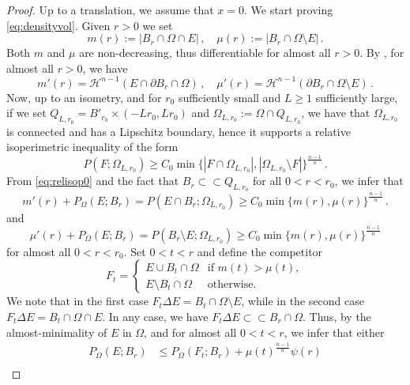 \documentclass[a4paper,reqno,11pt]{amsart}
\newcommand{\Hau}{{\mathcal H}} %
\newcommand{\de}{\partial}
\newcommand{\difsim}{\Delta}
\renewcommand{\Subset}{\subset\!\subset}
\newcommand{\pr}{P_{\Omega}}
\newcommand{\p}{P}
\begin{document}
\begin{proof}
		Up to a translation, we assume that $x=0$. We start proving \eqref{eq:densityvol}. Given $r>0$ we set
		\[
		m(r) := |B_{r} \cap \Omega\cap E| \, , \quad \mu(r) := |B_{r} \cap \Omega \setminus E| \,.
		\]
		Both $m$ and $\mu$ are non-decreasing, thus differentiable for almost all $r > 0$. By \cite[Example 13.3]{maggi2012sets}, for almost all $r > 0$, we have
		\[
		m'(r) = \Hau^{n-1}(E \cap \de B_{r} \cap \Omega) \, , \quad \mu'(r) = \Hau^{n-1}(\de B_{r} \cap \Omega \setminus E) \, .
		\]
Now, up to an isometry, and for $r_{0}$ sufficiently small and $L\ge 1$ sufficiently large, if we set $Q_{L,r_{0}} = B'_{r_{0}}\times (-Lr_{0},Lr_{0})$ and $\Omega_{L,r_{0}} := \Omega\cap Q_{L,r_{0}}$, we have that $\Omega_{L,r_{0}}$ is connected and has a Lipschitz boundary, hence it supports a relative isoperimetric inequality of the form
\begin{equation} \label{eq:relisop0}
\p(F;\Omega_{L,r_{0}}) \geq C_{0} \min \{|F\cap \Omega_{L,r_{0}}|, |\Omega_{L,r_{0}}\setminus F| \}^{\frac{n-1}{n}} \,.
\end{equation}
From \eqref{eq:relisop0} and the fact that $B_{r}\Subset Q_{L,r_{0}}$ for all $0<r<r_{0}$, we infer that 
\begin{equation} \label{eq:relisop}
m'(r) + \pr(E;B_{r}) = \p(E\cap B_{r};\Omega_{L,r_{0}}) \geq C_{0} \min \{ m(r), \mu(r) \}^{\frac{n-1}{n}} \,.
\end{equation}
and
\begin{equation} \label{eq:relisop-bis}
\mu'(r) + \pr(E;B_{r}) = \p(B_{r}\setminus E;\Omega_{L,r_{0}}) \geq C_{0} \min \{ m(r), \mu(r) \}^{\frac{n-1}{n}} 
\end{equation}
for almost all $0<r<r_{0}$. Set $0 < t < r$ and define the competitor 
		\[
		F_{t} =
		\begin{cases}
			E \cup B_{t} \cap \Omega & \text{if } m(t) > \mu(t),\\ 
			E \setminus B_{t} \cap \Omega &  \text{otherwise.} 
		\end{cases}
		\]
		We note that in the first case $F_{t} \difsim E = B_{t} \cap \Omega \setminus E$, while in the second case $F_{t} \difsim E = B_{t} \cap \Omega \cap E$. In any case, we have $F_{t} \difsim E \subset \subset B_{r} \cap \Omega$. Thus, by the almost-minimality of $E$ in $\Omega$, and for almost all $0<t<r$, we infer that either
		\begin{align} \label{2a}
			\pr(E;B_{r}) & \leq \pr(F_{t};B_{r}) + \mu(t)^{\frac{n-1}{n}} \psi(r) \\ 

\end{align}
\end{proof}
\end{document}
